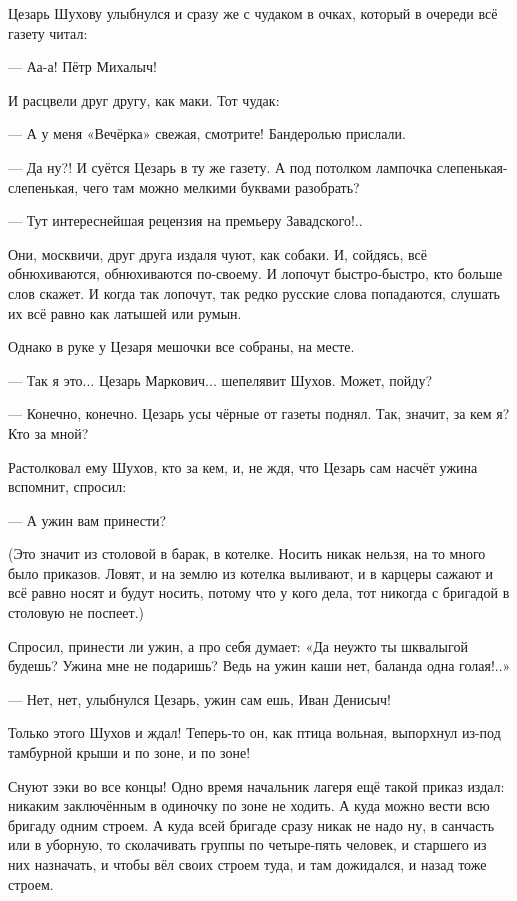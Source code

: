 Цезарь Шухову улыбнулся и сразу же с чудаком в очках, который в очереди всё газету читал:

--- Аа-а! Пётр Михалыч!

И \dash расцвели друг другу, как маки. Тот чудак:

--- А у меня «Вечёрка» свежая, смотрите! Бандеролью прислали.

--- Да ну?! \dash И суётся Цезарь в ту же газету. А под потолком лампочка слепенькая-слепенькая,
чего там можно мелкими буквами разобрать?

--- Тут интереснейшая рецензия на премьеру Завадского!..

Они, москвичи, друг друга издаля чуют, как собаки. И, сойдясь, всё обнюхиваются, обнюхиваются
по-своему. И лопочут быстро-быстро, кто больше слов скажет. И когда так лопочут, так редко
русские слова попадаются, слушать их \dash всё равно как латышей или румын.

Однако в руке у Цезаря мешочки все собраны, на месте.

--- Так я это... Цезарь Маркович... \dash шепелявит Шухов. \Dash Может, пойду?

--- Конечно, конечно. \dash Цезарь усы чёрные от газеты поднял. \Dash Так, значит, за кем я? Кто за мной?

Растолковал ему Шухов, кто за кем, и, не ждя, что Цезарь сам насчёт ужина вспомнит, спросил:

--- А ужин вам принести?

(Это значит \dash из столовой в барак, в котелке. Носить никак нельзя, на то много было приказов.
Ловят, и на землю из котелка выливают, и в карцеры сажают \dash и всё равно носят и будут носить,
потому что у кого дела, тот никогда с бригадой в столовую не поспеет.)

Спросил, принести ли ужин, а про себя думает: «Да неужто ты шквалыгой будешь? Ужина мне не
подаришь? Ведь на ужин каши нет, баланда одна голая!..»

--- Нет, нет, \dash улыбнулся Цезарь, \Dash ужин сам ешь, Иван Денисыч!

Только этого Шухов и ждал! Теперь-то он, как птица вольная, выпорхнул из-под тамбурной крыши
\dash и по зоне, и по зоне!

Снуют зэки во все концы! Одно время начальник лагеря ещё такой приказ издал: никаким
заключённым в одиночку по зоне не ходить. А куда можно \dash вести всю бригаду одним строем. А
куда всей бригаде сразу никак не надо \dash ну, в санчасть или в уборную, \dash то сколачивать группы
по четыре-пять человек, и старшего из них назначать, и чтобы вёл своих строем туда, и там
дожидался, и назад \dash тоже строем.

